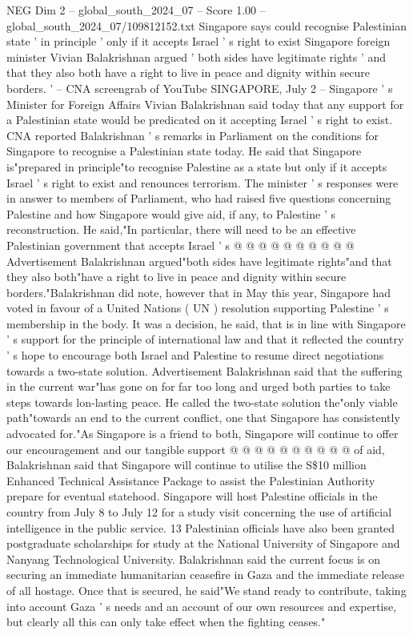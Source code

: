 \begin{textsample}{NEG Dim 2 – global\_south\_2024\_07 – Score 1.00 – global\_south\_2024\_07/109812152.txt}  \label{ex:f2_neg_377}
Singapore says could recognise Palestinian state ' in principle ' only if it accepts Israel ' s right to exist Singapore foreign minister Vivian Balakrishnan argued ' both sides have legitimate rights ' and that they also both have a right to live in peace and dignity within secure borders. ' -- CNA screengrab of YouTube SINGAPORE, July 2 -- Singapore ' s Minister for Foreign Affairs Vivian Balakrishnan said today that any support for a Palestinian state would be predicated on it accepting Israel ' s right to exist.
CNA reported Balakrishnan ' s remarks in Parliament on the conditions for Singapore to recognise a Palestinian state today.
He said that Singapore is"prepared in principle"to recognise Palestine as a state but only if it accepts Israel ' s right to exist and renounces terrorism.
The minister ' s responses were in answer to members of Parliament, who had raised five questions concerning Palestine and how Singapore would give aid, if any, to Palestine ' s reconstruction.
He said,"In particular, there will need to be an effective Palestinian government that accepts Israel ' s @ @ @ @ @ @ @ @ @ @ Advertisement Balakrishnan argued"both sides have legitimate rights"and that they also both"have a right to live in peace and dignity within secure borders."Balakrishnan did note, however that in May this year, Singapore had voted in favour of a United Nations ( UN ) resolution supporting Palestine ' s membership in the body.
It was a decision, he said, that is in line with Singapore ' s support for the principle of international law and that it reflected the country ' s hope to encourage both Israel and Palestine to resume direct negotiations towards a two-state solution.
Advertisement Balakrishnan said that the suffering in the current war"has gone on for far too long and urged both parties to take steps towards lon-lasting peace.
He called the two-state solution the"only viable path"towards an end to the current conflict, one that Singapore has consistently advocated for."As Singapore is a friend to both, Singapore will continue to offer our encouragement and our tangible support @ @ @ @ @ @ @ @ @ @ of aid, Balakrishnan said that Singapore will continue to utilise the S\$10 million Enhanced Technical Assistance Package to assist the Palestinian Authority prepare for eventual statehood.
Singapore will host Palestine officials in the country from July 8 to July 12 for a study visit concerning the use of artificial intelligence in the public service. 13 Palestinian officials have also been granted postgraduate scholarships for study at the National University of Singapore and Nanyang Technological University.
Balakrishnan said the current focus is on securing an immediate humanitarian ceasefire in Gaza and the immediate release of all hostage.
Once that is secured, he said"We stand ready to contribute, taking into account Gaza ' s needs and an account of our own resources and expertise, but clearly all this can only take effect when the fighting ceases."

\end{textsample}
